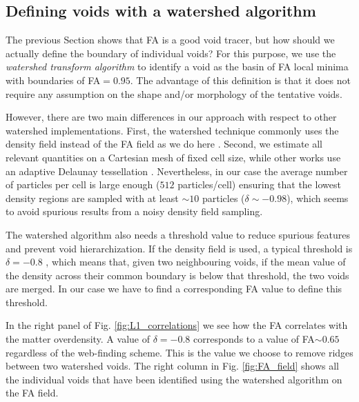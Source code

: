 \documentclass[a4,useAMS,usenatbib,usegraphicx]{mn2e}
\begin{document}
   
\subsection{Defining voids with a watershed algorithm}
\label{subsec:watershed}


The previous Section shows that FA is a good void tracer, but how
should we actually define the boundary of individual voids?
For this purpose, we use the \textit{watershed transform algorithm}
\citep{Beucher79,Beucher93} to identify a void as the basin of FA
local minima with boundaries of FA$=0.95$. 
The advantage of this definition is that it does not require any
assumption on the shape and/or morphology of the tentative voids. 

However, there are two main differences in our approach with respect to other
watershed implementations.
First, the watershed technique commonly uses the density field
instead of the FA field as we do here
\citep{Platen07,Neyrinck08}.   
Second, we estimate all relevant quantities on a Cartesian mesh of
fixed cell size, while other works use an adaptive Delaunay tessellation
\citep{Schaap00}.
Nevertheless, in our case the average number of particles per cell
  is large enough ($512$ particles/cell) ensuring that the lowest
  density regions are sampled with at least $\sim 10$ particles
  ($\delta \sim-0.98$), which seems to avoid spurious results from a
  noisy density field sampling.


The watershed algorithm also needs a threshold value to reduce
spurious features and prevent void hierarchization.  
If the density field is used, a typical threshold is
$\delta = -0.8$ \citep{Platen07},  which means that, given two neighbouring 
voids, if the mean value of the density across their common boundary is 
below that threshold, the two voids are merged.
In our case we have to find a corresponding FA value
to define this threshold.


In the right panel of Fig. \ref{fig:L1_correlations} we see how 
the FA correlates with the matter overdensity. 
A value of $\delta=-0.8$ corresponds to a value of FA$\sim 0.65$
regardless of the web-finding scheme. 
This is the value we choose to remove ridges between two watershed
voids. 
The right column in Fig. \ref{fig:FA_field} shows all the individual
voids that have been identified using the watershed algorithm on the
FA field.
\end{document}
